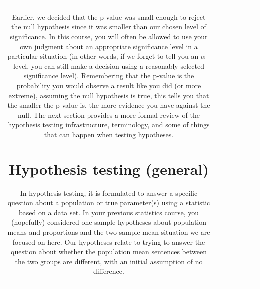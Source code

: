 \documentclass[]{book}
\theoremstyle{definition}
\theoremstyle{definition}
\theoremstyle{remark}
\begin{document}
\begin{longtable}[]{@{}ccccccc@{}}
\begin{minipage}[b]{0.10\columnwidth}
Earlier, we decided that the p-value was small enough to reject the null
hypothesis since it was smaller than our chosen level of significance.
In this course, you will often be allowed to use your own judgment about
an appropriate significance level in a particular situation (in other
words, if we forget to tell you an \(\alpha\) -level, you can still make
a decision using a reasonably selected significance level). Remembering
that the p-value is the probability you would observe a result like you
did (or more extreme), assuming the null hypothesis is true, this tells
you that the smaller the p-value is, the more evidence you have against
the null. The next section provides a more formal review of the
hypothesis testing infrastructure, terminology, and some of things that
can happen when testing hypotheses.

\section{Hypothesis testing (general)}\label{section2-5}

In hypothesis testing, it is formulated to answer a specific question
about a population or true parameter(s) using a statistic based on a
data set. In your previous statistics course, you (hopefully) considered
one-sample hypotheses about population means and proportions and the two
sample mean situation we are focused on here. Our hypotheses relate to
trying to answer the question about whether the population mean
sentences between the two groups are different, with an initial
assumption of no difference.


\end{minipage}
\end{longtable}
\end{document}
